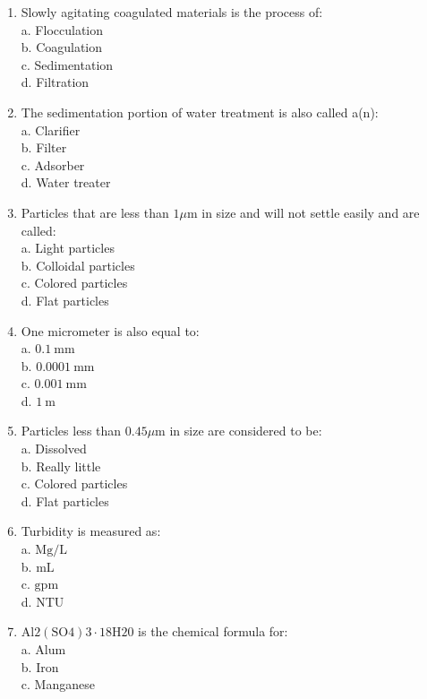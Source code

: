 \begin{enumerate}
\item Slowly agitating coagulated materials is the process of:\\
a. Flocculation\\
b. Coagulation\\
c. Sedimentation\\
d. Filtration\\
\item The sedimentation portion of water treatment is also called a(n):\\
a. Clarifier\\
b. Filter\\
c. Adsorber\\
d. Water treater\\
\item Particles that are less than $1 \mu \mathrm{m}$ in size and will not settle easily and are called:\\
a. Light particles\\
b. Colloidal particles\\
c. Colored particles\\
d. Flat particles\\
\item One micrometer is also equal to:\\
a. $0.1 \mathrm{~mm}$\\
b. $0.0001 \mathrm{~mm}$\\
c. $0.001 \mathrm{~mm}$\\
d. $1 \mathrm{~m}$\\
\item Particles less than $0.45 \mu \mathrm{m}$ in size are considered to be:\\
a. Dissolved\\
b. Really little\\
c. Colored particles\\
d. Flat particles\\
\item Turbidity is measured as:\\
a. $\mathrm{Mg} / \mathrm{L}$\\
b. $\mathrm{mL}$\\
c. $\mathrm{gpm}$\\
d. NTU\\
\item $\mathrm{Al} 2(\mathrm{SO} 4) 3 \cdot 18 \mathrm{H} 20$ is the chemical formula for:\\
a. Alum\\
b. Iron\\
c. Manganese\\

\end{enumerate}

